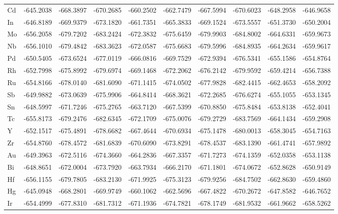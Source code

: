 \begin{table}[h]
{\begin{tabular}{*{10}{l}}
    Cd & -645.2038 & -668.3897 & -670.2685 & -660.2502 & -662.7479 & -667.5994 & -670.6023 & -648.2958 & -646.9658 \\
    In & -646.8189 & -669.9379 & -673.1820 & -661.7351 & -665.3833 & -669.1524 & -673.5557 & -651.3730 & -650.2004 \\
    Mo & -656.2058 & -679.7202 & -683.2424 & -672.3832 & -675.6459 & -679.9903 & -684.8002 & -664.6331 & -659.9673 \\
    Nb & -656.1010 & -679.4842 & -683.3623 & -672.0587 & -675.6683 & -679.5996 & -684.8935 & -664.2634 & -659.9617 \\
    Pd & -650.5405 & -673.6524 & -677.0119 & -666.0816 & -669.7529 & -672.9394 & -676.5341 & -655.1586 & -654.8764 \\
    Rh & -652.7998 & -675.8992 & -679.6974 & -669.1468 & -672.2062 & -676.2142 & -679.9592 & -659.4214 & -656.7388 \\
    Ru & -654.8166 & -678.0140 & -681.6090 & -671.1415 & -674.0502 & -677.9828 & -682.4415 & -662.4653 & -658.2092 \\
    Sb & -649.9882 & -673.0639 & -675.9906 & -664.8414 & -668.3621 & -672.2685 & -676.6274 & -655.1055 & -653.1345 \\
    Sn & -648.5997 & -671.7246 & -675.2765 & -663.7120 & -667.5399 & -670.8850 & -675.8484 & -653.8138 & -652.4041 \\
    Tc & -655.8173 & -679.2476 & -682.6345 & -672.1709 & -675.0076 & -679.2729 & -683.7569 & -664.1434 & -659.2908 \\
    Y  & -652.1517 & -675.4891 & -678.6682 & -667.4644 & -670.6934 & -675.1478 & -680.0013 & -658.3045 & -654.7163 \\
    Zr & -654.8760 & -678.4572 & -681.6839 & -670.6090 & -673.8291 & -678.4537 & -683.1390 & -661.4741 & -657.9892 \\
    Au & -649.3963 & -672.5116 & -674.3660 & -664.2836 & -667.3357 & -671.7273 & -674.1359 & -652.0358 & -653.1138 \\
    Bi & -648.8651 & -672.0004 & -673.7920 & -663.7934 & -666.2170 & -671.1801 & -674.0672 & -652.8628 & -650.9149 \\
    Hf & -656.1155 & -679.7805 & -683.2130 & -671.9925 & -675.3123 & -679.9256 & -684.7502 & -662.8630 & -659.4860 \\
    Hg & -645.0948 & -668.2801 & -669.9749 & -660.1062 & -662.5696 & -667.4822 & -670.2672 & -647.8582 & -646.7652 \\
    Ir & -654.4999 & -677.8310 & -681.7312 & -671.1936 & -674.7821 & -678.1749 & -681.9532 & -661.9662 & -658.5262 \\

\end{tabular}}
\end{table}

